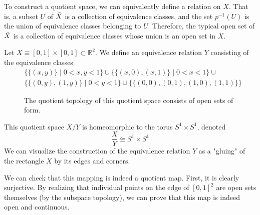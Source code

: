   To construct a quotient space, we can equivalently define a relation on $X$. That is, a subset $U$ of $\Tilde{X}$ is a collection of equivalence classes, and the set $p^{-1}(U)$ is the union of equivalence classes belonging to $U$. Therefore, the typical open set of $\Tilde{X}$ is a collection of equivalence classes whose union is an open set in $X$. 

  \begin{example}
    Let $X \equiv [0,1] \times [0,1] \subset \mathbb{R}^2$. We define an equivalence relation $Y$ consisting of the equivalence classes
    \begin{align*}
        &\big\{\{(x, y)\} \; | \; 0<x, y<1\big\} \cup \big\{ \{(x, 0), (x,1)\} \; | \; 0<x<1 \big\} \cup \\
        &\big\{ \{(0,y), (1,y)\} \; | \; 0<y<1 \big\} \cup \big\{ \{(0,0), (0,1), (1,0), (1,1)\} \big\}
    \end{align*} 

    \begin{figure}[H]
      \centering 
      \caption{The quotient topology of this quotient space consists of open sets of form. } 
      \label{fig:torus_basis}
    \end{figure}
    This quotient space $X / Y$ is homeomorphic to the torus $S^1 \times S^1$, denoted
    \begin{equation}
      \frac{X}{Y} \cong S^1 \times S^1
    \end{equation}
    We can visualize the construction of the equivalence relation $Y$ as a "gluing" of the rectangle $X$ by its edges and corners. 

    We can check that this mapping is indeed a quotient map. First, it is clearly surjective. By realizing that individual points on the edge of $[0,1]^2$ are open sets themselves (by the subspace topology), we can prove that this map is indeed open and continuous. 
  \end{example}

